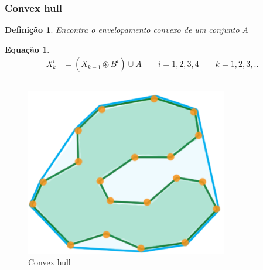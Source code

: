 \documentclass[aspectratio=169]{beamer}
\theoremstyle{Definition}
\newtheorem{defn}{Defini\c c\~ao}
\newtheorem{eq}[theorem]{Equa\c c\~ao}
\begin{document}
\begin{frame}
	\frametitle{Convex hull}
	
	\begin{defn}
		Encontra o envelopamento convexo de um conjunto A
	\end{defn}
	
	\begin{eq}
	
		\begin{align*}
			X^i_k& = ( X_{k-1} \circledast B^i) \cup A \qquad i = 1, 2, 3, 4 \qquad k = 1, 2, 3,..
		\end{align*}

	\end{eq}
	
	\begin{columns}
		\begin{column}{0.5\textwidth}
			\begin{figure}[h]
	  		 	\includegraphics[height=0.15\paperheight]{imagens/convex_hull}
				\caption{Convex hull}\label{figConvexHull1}
			\end{figure}
		\end{column}
		\begin{column}{0.5\textwidth}
			\begin{figure}[h]

\end{figure}
\end{column}
\end{columns}
\end{frame}
\end{document}
